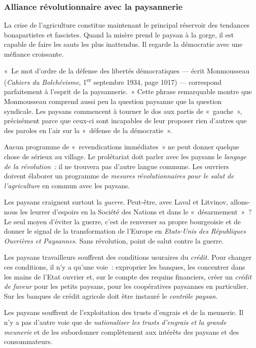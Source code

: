 \documentclass[french,twoside]{book} %
\begin{document}
\subsubsection[{Alliance révolutionnaire avec la paysannerie}]{Alliance révolutionnaire avec la paysannerie}
\noindent La crise de l’agriculture constitue maintenant le principal réservoir des tendances bonapartistes et fascistes. Quand la misère prend le paysan à la gorge, il est capable de faire les sauts les plus inattendus. Il regarde la démocratie avec une méfiance croissante.\par
« Le mot d’ordre de la défense des libertés démocratiques — écrit Monmousseau (\emph{Cahiers du Bolchévisme}, 1\textsuperscript{er} septembre 1934, page 1017) — correspond parfaitement à l’esprit de la paysannerie. » Cette phrase remarquable montre que Monmousseau comprend aussi peu la question paysanne que la question syndicale. Les paysans commencent à tourner le dos aux partis de « gauche », précisément parce que ceux-ci sont incapables de leur proposer rien d’autres que des paroles en l’air sur la « défense de la démocratie ».\par
 Aucun programme de « revendications immédiates » ne peut donner quelque chose de sérieux au village. Le prolétariat doit parler avec les paysans le \emph{langage de la révolution :} il ne trouvera pas d’autre langue commune. Les ouvriers doivent élaborer un programme de \emph{mesures révolutionnaires pour le salut de l’agriculture} en commun avec les paysans.\par
Les paysans craignent surtout la \emph{guerre}. Peut-être, avec Laval et Litvinov, allons-nous les leurrer d’espoirs en la Société des Nations et dans le « désarmement » ? Le seul moyen d’éviter la guerre, c’est de renverser sa propre bourgeoisie et de donner le signal de la transformation de l’Europe en \emph{Etats-Unis des Républiques Ouvrières et Paysannes.} Sans révolution, point de salut contre la guerre.\par
Les paysans travailleurs souffrent des conditions usuraires du \emph{crédit.} Pour changer ces conditions, il n’y a qu’une voie : exproprier les banques, les concentrer dans les mains de l’Etat ouvrier et, sur le compte des requins financiers, créer un \emph{crédit de faveur} pour les petits paysans, pour les coopératives paysannes en particulier. Sur les banques de crédit agricole doit être instauré le \emph{contrôle paysan}.\par
Les paysans souffrent de l’exploitation des trusts d’engrais et de la meunerie. Il n’y a pas d’autre voie que de \emph{nationaliser les trusts d’engrais et la grande meunerie} et de les subordonner complètement aux intérêts des paysans et des consommateurs.\par
\end{document}

